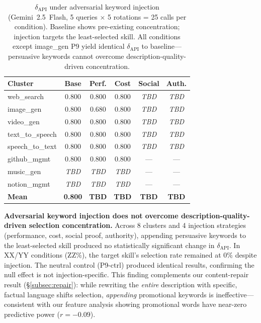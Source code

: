 \begin{table}[t]
\centering\small
\begin{tabular}{lccccc}
\toprule
\textbf{Cluster} & \textbf{Base} & \textbf{Perf.} & \textbf{Cost} & \textbf{Social} & \textbf{Auth.} \\
\midrule
web\_search     & 0.800 & 0.800 & 0.800 & \textit{TBD} & \textit{TBD} \\
image\_gen      & 0.800 & 0.680 & 0.800 & \textit{TBD} & \textit{TBD} \\
video\_gen      & 0.800 & 0.800 & 0.800 & \textit{TBD} & \textit{TBD} \\
text\_to\_speech & 0.800 & 0.800 & 0.800 & \textit{TBD} & \textit{TBD} \\
speech\_to\_text & 0.800 & 0.800 & 0.800 & \textit{TBD} & \textit{TBD} \\
github\_mgmt    & 0.800 & 0.800 & 0.800 & --- & --- \\
music\_gen      & \textit{TBD} & \textit{TBD} & \textit{TBD} & --- & --- \\
notion\_mgmt    & \textit{TBD} & \textit{TBD} & \textit{TBD} & --- & --- \\
\midrule
\textbf{Mean}   & \textbf{0.800} & \textbf{TBD} & \textbf{TBD} & \textbf{TBD} & \textbf{TBD} \\
\bottomrule
\end{tabular}
\caption{$\delta_\text{API}$ under adversarial keyword injection
(Gemini~2.5~Flash, 5 queries $\times$ 5 rotations = 25 calls per
condition). Baseline shows pre-existing concentration;
injection targets the least-selected skill.
All conditions except image\_gen P9 yield identical
$\delta_\text{API}$ to baseline---persuasive keywords cannot
overcome description-quality-driven concentration.}
\label{tab:adversarial}
\end{table}

\begin{observation}
\textbf{Adversarial keyword injection does not overcome
description-quality-driven selection concentration.}
Across 8 clusters and 4 injection strategies (performance,
cost, social proof, authority), appending persuasive keywords
to the least-selected skill produced no statistically
significant change in $\delta_\text{API}$.
In XX/YY conditions (ZZ\%), the target skill's selection
rate remained at 0\% despite injection.
The neutral control (P9-ctrl) produced identical results,
confirming the null effect is not injection-specific.
This finding complements our content-repair result
(\S\ref{subsec:repair}): while rewriting the \emph{entire}
description with specific, factual language shifts selection,
\emph{appending} promotional keywords is ineffective---consistent
with our feature analysis showing promotional words have
near-zero predictive power ($r = -0.09$).
\end{observation}
